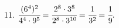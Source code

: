 11. $\cfrac{(6^4)^2}{4^4\cdot9^5}=\cfrac{2^8\cdot3^8}{2^8\cdot3^{10}}=\cfrac{1}{3^2}=\cfrac{1}{9}.$\\
